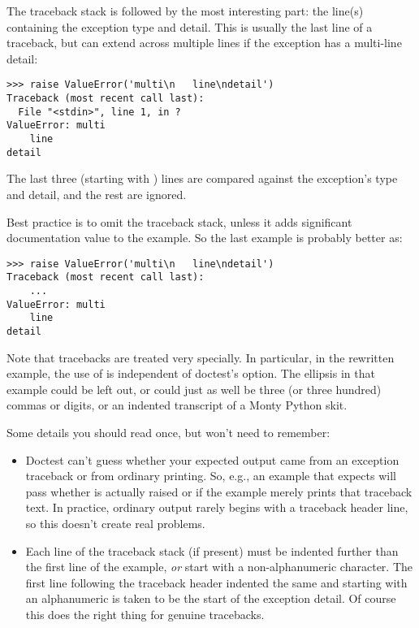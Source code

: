 The traceback stack is followed by the most interesting part:  the
line(s) containing the exception type and detail.  This is usually the
last line of a traceback, but can extend across multiple lines if the
exception has a multi-line detail:

\begin{verbatim}
>>> raise ValueError('multi\n   line\ndetail')
Traceback (most recent call last):
  File "<stdin>", line 1, in ?
ValueError: multi
    line
detail
\end{verbatim}

The last three (starting with ) lines are
compared against the exception's type and detail, and the rest are
ignored.

Best practice is to omit the traceback stack, unless it adds
significant documentation value to the example.  So the last example
is probably better as:

\begin{verbatim}
>>> raise ValueError('multi\n   line\ndetail')
Traceback (most recent call last):
    ...
ValueError: multi
    line
detail
\end{verbatim}

Note that tracebacks are treated very specially.  In particular, in the
rewritten example, the use of  is independent of doctest's
 option.  The ellipsis in that example could be left
out, or could just as well be three (or three hundred) commas or digits,
or an indented transcript of a Monty Python skit.

Some details you should read once, but won't need to remember:

\begin{itemize}

\item Doctest can't guess whether your expected output came from an
  exception traceback or from ordinary printing.  So, e.g., an example
  that expects  will pass whether
   is actually raised or if the example merely
  prints that traceback text.  In practice, ordinary output rarely begins
  with a traceback header line, so this doesn't create real problems.

\item Each line of the traceback stack (if present) must be indented
  further than the first line of the example, \emph{or} start with a
  non-alphanumeric character.  The first line following the traceback
  header indented the same and starting with an alphanumeric is taken
  to be the start of the exception detail.  Of course this does the
  right thing for genuine tracebacks.

\end{itemize}

